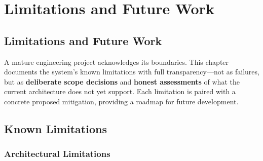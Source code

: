 
\chapter{Limitations and Future Work}
\label{chap:limitations}
\newpage
\section*{Limitations and Future Work}


A mature engineering project acknowledges its boundaries. This chapter documents the system's known limitations with full transparency---not as failures, but as \textbf{deliberate scope decisions} and \textbf{honest assessments} of what the current architecture does not yet support. Each limitation is paired with a concrete proposed mitigation, providing a roadmap for future development.

\section{Known Limitations}
\label{sec:limitations}

\subsection{Architectural Limitations}


